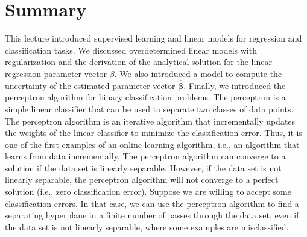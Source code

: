 \documentclass{article}[11pt]
\begin{document}
\section{Summary}
This lecture introduced supervised learning and linear models for regression and classification tasks.
We discussed overdetermined linear models with regularization and the derivation of the analytical solution for the linear regression parameter vector $\beta$.
We also introduced a model to compute the uncertainty of the estimated parameter vector $\hat{\mathbf{\beta}}$.
Finally, we introduced the perceptron algorithm for binary classification problems.
The perceptron is a simple linear classifier that can be used to separate two classes of data points.
The perceptron algorithm is an iterative algorithm that incrementally updates the weights of the linear classifier to minimize the classification error.
Thus, it is one of the first examples of an online learning algorithm, i.e., an algorithm that learns from data incrementally.
The perceptron algorithm can converge to a solution if the data set is linearly separable.
However, if the data set is not linearly separable, the perceptron algorithm will not converge to a perfect solution (i.e., zero classification error).
Suppose we are willing to accept some classification errors. In that case, we can use the perceptron algorithm to find a separating hyperplane in a finite number of passes through the data set, 
even if the data set is not linearly separable, where some examples are misclassified.


\end{document}
